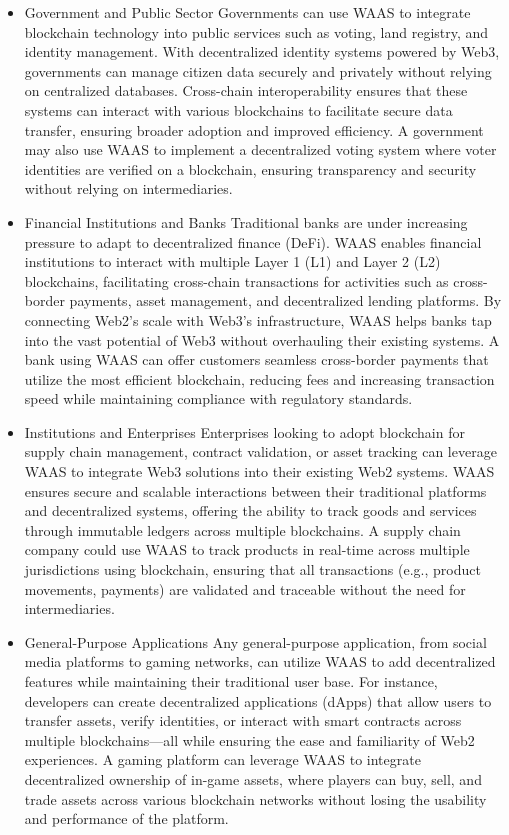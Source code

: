 \begin{itemize}
    \item Government and Public Sector Governments can use WAAS to integrate blockchain technology into public services such as voting, land registry, and identity management. With decentralized identity systems powered by Web3, governments can manage citizen data securely and privately without relying on centralized databases. Cross-chain interoperability ensures that these systems can interact with various blockchains to facilitate secure data transfer, ensuring broader adoption and improved efficiency. A government may also use WAAS to implement a decentralized voting system where voter identities are verified on a blockchain, ensuring transparency and security without relying on intermediaries.

    \item Financial Institutions and Banks Traditional banks are under increasing pressure to adapt to decentralized finance (DeFi). WAAS enables financial institutions to interact with multiple Layer 1 (L1) and Layer 2 (L2) blockchains, facilitating cross-chain transactions for activities such as cross-border payments, asset management, and decentralized lending platforms. By connecting Web2’s scale with Web3’s infrastructure, WAAS helps banks tap into the vast potential of Web3 without overhauling their existing systems. A bank using WAAS can offer customers seamless cross-border payments that utilize the most efficient blockchain, reducing fees and increasing transaction speed while maintaining compliance with regulatory standards.

    \item Institutions and Enterprises Enterprises looking to adopt blockchain for supply chain management, contract validation, or asset tracking can leverage WAAS to integrate Web3 solutions into their existing Web2 systems. WAAS ensures secure and scalable interactions between their traditional platforms and decentralized systems, offering the ability to track goods and services through immutable ledgers across multiple blockchains. A supply chain company could use WAAS to track products in real-time across multiple jurisdictions using blockchain, ensuring that all transactions (e.g., product movements, payments) are validated and traceable without the need for intermediaries.

    \item General-Purpose Applications Any general-purpose application, from social media platforms to gaming networks, can utilize WAAS to add decentralized features while maintaining their traditional user base. For instance, developers can create decentralized applications (dApps) that allow users to transfer assets, verify identities, or interact with smart contracts across multiple blockchains—all while ensuring the ease and familiarity of Web2 experiences. A gaming platform can leverage WAAS to integrate decentralized ownership of in-game assets, where players can buy, sell, and trade assets across various blockchain networks without losing the usability and performance of the platform.
\end{itemize}


